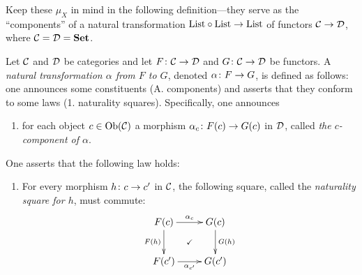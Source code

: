 \documentclass[CT4S-EN-RU]{subfiles}
\begin{document}
\begin{blockENG}
Keep these $\mu_X$ in mind in the following definition—they serve as the “components” of a natural transformation $\textnormal{List}\circ\textnormal{List}\rightarrow\textnormal{List}$ of functors $\mathcal{C}\rightarrow\mathcal{D}$, where $\mathcal{C}=\mathcal{D}={\bf Set}$.
\end{blockENG}

\begin{blockRUS}
\end{blockRUS}

\begin{definitionENG}\label{def:natural transformation}
Let $\mathcal{C}$ and $\mathcal{D}$ be categories and let $F\colon\mathcal{C}\rightarrow\mathcal{D}$ and $G\colon\mathcal{C}\rightarrow\mathcal{D}$ be functors. A {\em natural transformation $\alpha$ from $F$ to $G$}, denoted $\alpha\colon F\rightarrow G$, is defined as follows: one announces some constituents (A. components) and asserts that they conform to some laws (1. naturality squares). Specifically, one announces
\begin{enumerate}[\hsp A.]
\item for each object $c\in\textnormal{Ob}(\mathcal{C})$ a morphism $\alpha_c\colon F(c)\rightarrow G(c)$ in $\mathcal{D}$, called {\em the $c$-component of $\alpha$}.
\end{enumerate}
One asserts that the following law holds:
\begin{enumerate}[\hsp 1.]
\item For every morphism $h\colon c\rightarrow c'$ in $\mathcal{C}$, the following square, called the {\em naturality square for $h$}, must commute:
\begin{align}\label{dia:naturality square}
\xymatrix{F(c)\ar@{}[dr]|{\checkmark}\ar[d]_{F(h)}\ar[r]^{\alpha_c}&G(c)\ar[d]^{G(h)}\\F(c')\ar[r]_{\alpha_{c'}}&G(c')}
\end{align}
\end{enumerate}
\end{definitionENG}

\begin{definitionRUS}\label{def:natural transformation}
\end{definitionRUS}
\end{document}
